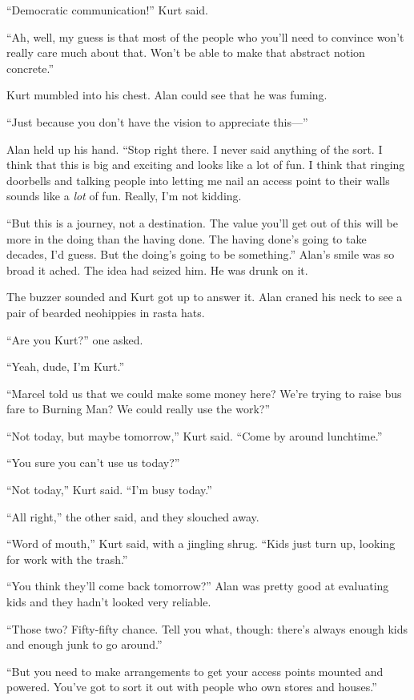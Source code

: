 \documentclass{article}
\begin{document}
``Democratic communication!'' Kurt said.

``Ah, well, my guess is that most of the people who you'll need to
convince won't really care much about that.  Won't be able to make
that abstract notion concrete.''

Kurt mumbled into his chest.  Alan could see that he was fuming.

``Just because you don't have the vision to appreciate this---''

Alan held up his hand.  ``Stop right there.  I never said anything of
the sort.  I think that this is big and exciting and looks like a lot
of fun.  I think that ringing doorbells and talking people into
letting me nail an access point to their walls sounds like a
\textit{lot} of fun.  Really, I'm not kidding.

``But this is a journey, not a destination.  The value you'll get out
of this will be more in the doing than the having done.  The having
done's going to take decades, I'd guess.  But the doing's going to be
something.'' Alan's smile was so broad it ached.  The idea had seized
him.  He was drunk on it.

The buzzer sounded and Kurt got up to answer it.  Alan craned his neck
to see a pair of bearded neohippies in rasta hats. 

``Are you Kurt?'' one asked.

``Yeah, dude, I'm Kurt.''

``Marcel told us that we could make some money here?  We're trying to
raise bus fare to Burning Man?  We could really use the work?''

``Not today, but maybe tomorrow,'' Kurt said.  ``Come by around
lunchtime.''

``You sure you can't use us today?''

``Not today,'' Kurt said.  ``I'm busy today.''

``All right,'' the other said, and they slouched away.

``Word of mouth,'' Kurt said, with a jingling shrug.  ``Kids just turn
up, looking for work with the trash.''

``You think they'll come back tomorrow?'' Alan was pretty good at
evaluating kids and they hadn't looked very reliable.

``Those two?  Fifty-fifty chance.  Tell you what, though:  there's
always enough kids and enough junk to go around.''

``But you need to make arrangements to get your access points mounted
and powered.  You've got to sort it out with people who own stores and
houses.''
\end{document}

